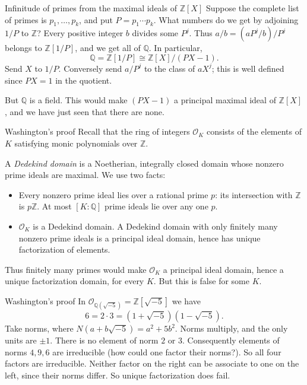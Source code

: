 \documentclass[aspectratio=169,11pt]{beamer}
\newcommand{\Z}{\mathbb Z}
\begin{document}
\begin{frame}{Infinitude of primes from the maximal ideals of $\Z[X]$}
Suppose the complete list of primes is $p_1,\ldots,p_k$, and put $P=p_1\cdots p_k$. What numbers do we get by adjoining $1/P$ to $\Z$? Every positive integer $b$ divides some $P^j$. Thus $a/b=(aP^j/b)/P^j$ belongs to $\Z[1/P]$, and we get all of $\mathbb Q$. In particular,
\[\mathbb Q=\Z[1/P]\cong\Z[X]/(PX-1).\]
Send $X$ to $1/P$. Conversely send $a/P^j$ to the class of $aX^j$; this is well defined since $PX=1$ in the quotient.

But $\mathbb Q$ is a field. This would make $(PX-1)$ a principal maximal ideal of $\Z[X]$, and we have just seen that there are none.
\end{frame}
\begin{frame}{Washington's proof}
Recall that the ring of integers $\mathcal O_K$ consists of the elements of $K$ satisfying monic polynomials over $\Z$.

A \emph{Dedekind domain} is a Noetherian, integrally closed domain whose nonzero prime ideals are maximal. We use two facts:
\begin{itemize}
\item Every nonzero prime ideal lies over a rational prime $p$: its intersection with $\Z$ is $p\Z$. At most $[K:\mathbb Q]$ prime ideals lie over any one $p$.
\item $\mathcal O_K$ is a Dedekind domain. A Dedekind domain with only finitely many nonzero prime ideals is a principal ideal domain, hence has unique factorization of elements.
\end{itemize}
Thus finitely many primes would make $\mathcal O_K$ a principal ideal domain, hence a unique factorization domain, for every $K$. But this is false for some $K$.
\end{frame}
\begin{frame}{Washington's proof}
In $\mathcal O_{\mathbb Q(\sqrt{-5})}=\Z[\sqrt{-5}]$ we have
\[6=2\cdot3=(1+\sqrt{-5})(1-\sqrt{-5}).\]
Take norms, where $N(a+b\sqrt{-5})=a^2+5b^2$. Norms multiply, and the only units are $\pm1$. There is no element of norm $2$ or $3$. Consequently elements of norms $4,9,6$ are irreducible (how could one factor their norms?). So all four factors are irreducible. Neither factor on the right can be associate to one on the left, since their norms differ. So unique factorization does fail.
\end{frame}
\end{document}
